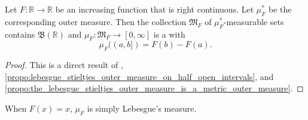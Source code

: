 \documentclass[notoc,notitlepage]{tufte-book}
\begin{document}
\begin{thm}\label{thm:lebesgue_stieltjes_theorem_by_caratheodory}
  Let $F : \mathbb{R} \to \mathbb{R}$ be an increasing function
  that is right continuous.
  Let $\mu_F^*$ be the corresponding outer measure.
  Then the collection $\mathfrak{M}_F$
  of $\mu_F^*$-measurable sets contains $\mathfrak{B}(\mathbb{R})$
  and $\mu_F : \mathfrak{M}_F \to [0, \infty]$
  is a  with
  \begin{equation*}
    \mu_F((a, b]) = F(b) - F(a).
  \end{equation*}
\end{thm}

\begin{proof}
  This is a direct result of
  ,
  \cref{propo:lebesgue_stieltjes_outer_measure_on_half_open_intervals},
  and
  \cref{propo:the_lebesgue_stieltjes_outer_measure_is_a_metric_outer_measure}.
\end{proof}

\begin{eg}
  When $F(x) = x$, $\mu_F$ is simply Lebesgue's measure.
\end{eg}
\end{document}

